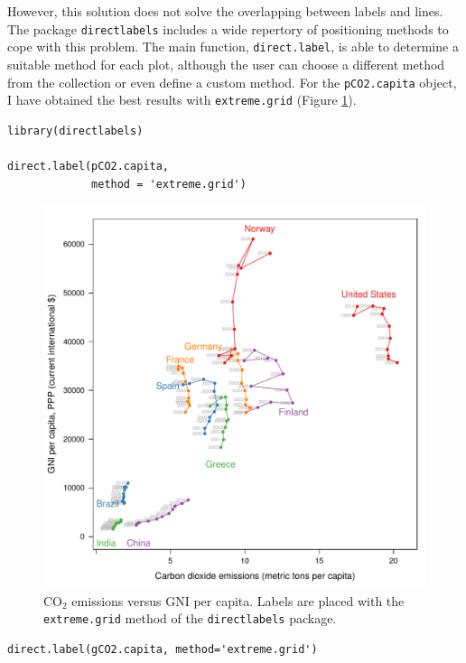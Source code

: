 However, this solution does not solve the overlapping between labels
and lines. The package \texttt{directlabels} \cite{Hocking2013} includes a
wide repertory of positioning methods to cope with this problem. The
main function, \texttt{direct.label}, is able to determine a suitable method
for each plot, although the user can choose a different method from
the collection or even define a custom method. For the \texttt{pCO2.capita}
object, I have obtained the best results with \texttt{extreme.grid} (Figure
\ref{fig:CO2-GNI-DL}).


\lstset{language=r,label= ,caption= ,captionpos=b,numbers=none}
\begin{lstlisting}
library(directlabels)

direct.label(pCO2.capita,
             method = 'extreme.grid')
\end{lstlisting}

\begin{figure}[htbp]
\centering
\includegraphics[width=.9\linewidth]{figs/CO2_capitaDL.pdf}
\caption{\(\mathrm{CO_2}\) emissions versus GNI per capita. Labels are placed with the \texttt{extreme.grid} method of the \texttt{directlabels} package. \label{fig:CO2-GNI-DL}}
\end{figure}

\lstset{language=r,label= ,caption= ,captionpos=b,numbers=none}
\begin{lstlisting}
direct.label(gCO2.capita, method='extreme.grid')
\end{lstlisting}

